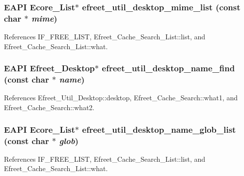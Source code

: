 \subsubsection[efreet\_\-util\_\-desktop\_\-mime\_\-list]{\setlength{\rightskip}{0pt plus 5cm}EAPI Ecore\_\-List$\ast$ efreet\_\-util\_\-desktop\_\-mime\_\-list (const char $\ast$ {\em mime})}\label{efreet__utils_8c_182eda986577cbf4b56b32dfe7ed6579}




References IF\_\-FREE\_\-LIST, Efreet\_\-Cache\_\-Search\_\-List::list, and Efreet\_\-Cache\_\-Search\_\-List::what.
\subsubsection[efreet\_\-util\_\-desktop\_\-name\_\-find]{\setlength{\rightskip}{0pt plus 5cm}EAPI {\bf Efreet\_\-Desktop}$\ast$ efreet\_\-util\_\-desktop\_\-name\_\-find (const char $\ast$ {\em name})}\label{efreet__utils_8c_0852e1834372099771d125aff627b952}




References Efreet\_\-Util\_\-Desktop::desktop, Efreet\_\-Cache\_\-Search::what1, and Efreet\_\-Cache\_\-Search::what2.
\subsubsection[efreet\_\-util\_\-desktop\_\-name\_\-glob\_\-list]{\setlength{\rightskip}{0pt plus 5cm}EAPI Ecore\_\-List$\ast$ efreet\_\-util\_\-desktop\_\-name\_\-glob\_\-list (const char $\ast$ {\em glob})}\label{efreet__utils_8c_4e1a01c2e8375828de99e6b91187278d}




References IF\_\-FREE\_\-LIST, Efreet\_\-Cache\_\-Search\_\-List::list, and Efreet\_\-Cache\_\-Search\_\-List::what.
